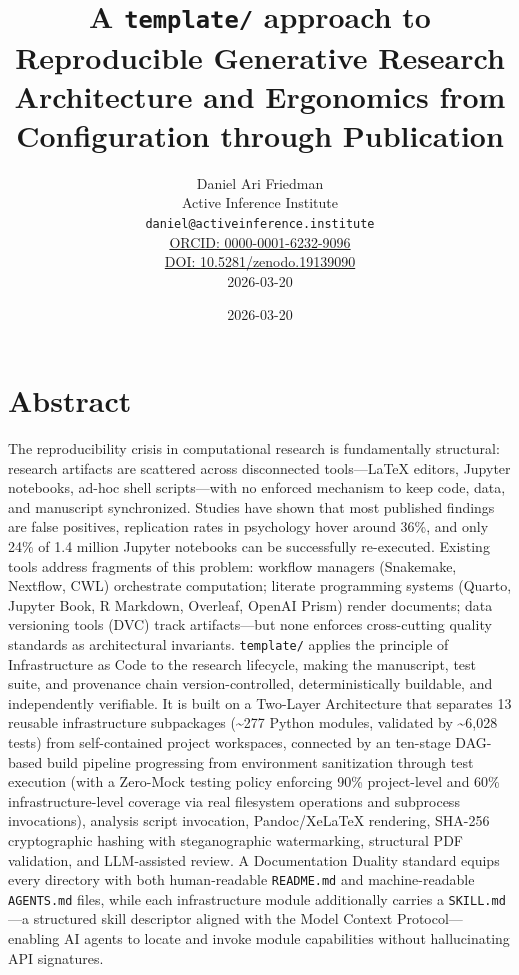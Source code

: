 \documentclass[
]{article}
\author{}
\date{}
\title{A \texttt{template/} approach to Reproducible Generative Research\\\normalsize Architecture and Ergonomics from Configuration through Publication}
\author{Daniel Ari Friedman\\\footnotesize{Active Inference Institute}\\\footnotesize{\texttt{daniel@activeinference.institute}}\\\footnotesize{\href{https://orcid.org/0000-0001-6232-9096}{ORCID: 0000-0001-6232-9096}} \\ \footnotesize{\href{https://doi.org/10.5281/zenodo.19139090}{DOI: 10.5281/zenodo.19139090}} \\ \footnotesize{2026-03-20}}
\date{2026-03-20}
\newcounter{none} %
\begin{document}
\maketitle
\thispagestyle{empty}
\tableofcontents
\newpage


\section{Abstract}\label{abstract}

The reproducibility crisis in computational research is fundamentally
structural: research artifacts are scattered across disconnected
tools---LaTeX editors, Jupyter notebooks, ad-hoc shell scripts---with no
enforced mechanism to keep code, data, and manuscript synchronized.
Studies have shown that most published findings are false positives,
replication rates in psychology hover around 36\%, and only 24\% of 1.4
million Jupyter notebooks can be successfully re-executed. Existing
tools address fragments of this problem: workflow managers (Snakemake,
Nextflow, CWL) orchestrate computation; literate programming systems
(Quarto, Jupyter Book, R Markdown, Overleaf, OpenAI Prism) render
documents; data versioning tools (DVC) track artifacts---but none
enforces cross-cutting quality standards as architectural invariants.
\texttt{template/} applies the principle of Infrastructure as Code to
the research lifecycle, making the manuscript, test suite, and
provenance chain version-controlled, deterministically buildable, and
independently verifiable. It is built on a Two-Layer Architecture that
separates 13 reusable infrastructure subpackages (\textasciitilde277
Python modules, validated by \textasciitilde6,028 tests) from
self-contained project workspaces, connected by an ten-stage DAG-based
build pipeline progressing from environment sanitization through test
execution (with a Zero-Mock testing policy enforcing 90\% project-level
and 60\% infrastructure-level coverage via real filesystem operations
and subprocess invocations), analysis script invocation, Pandoc/XeLaTeX
rendering, SHA-256 cryptographic hashing with steganographic
watermarking, structural PDF validation, and LLM-assisted review. A
Documentation Duality standard equips every directory with both
human-readable \texttt{README.md} and machine-readable
\texttt{AGENTS.md} files, while each infrastructure module additionally
carries a \texttt{SKILL.md}---a structured skill descriptor aligned with
the Model Context Protocol---enabling AI agents to locate and invoke
module capabilities without hallucinating API signatures.
\end{document}

